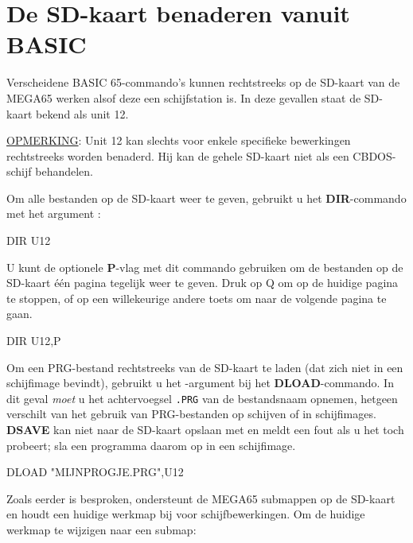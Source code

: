 \section{De SD-kaart benaderen vanuit BASIC}

Verscheidene BASIC 65-commando's kunnen rechtstreeks op de SD-kaart van de MEGA65 werken alsof deze een schijfstation is. In deze gevallen staat de SD-kaart bekend als unit 12.

\underline{OPMERKING}: Unit 12 kan slechts voor enkele specifieke bewerkingen rechtstreeks worden benaderd. Hij kan de gehele SD-kaart niet als een CBDOS-schijf behandelen.

Om alle bestanden op de SD-kaart weer te geven, gebruikt u het {\bf DIR}-commando met het argument :

\begin{screencode}
DIR U12
\end{screencode}

U kunt de optionele {\bf P}-vlag met dit commando gebruiken om de bestanden op de SD-kaart één pagina tegelijk weer te geven. Druk op Q om op de huidige pagina te stoppen, of op een willekeurige andere toets om naar de volgende pagina te gaan.

\begin{screencode}
DIR U12,P
\end{screencode}

Om een PRG-bestand rechtstreeks van de SD-kaart te laden (dat zich niet in een schijfimage bevindt), gebruikt u het -argument bij het {\bf DLOAD}-commando. In dit geval {\em moet} u het achtervoegsel {\tt .PRG} van de bestandsnaam opnemen, hetgeen verschilt van het gebruik van PRG-bestanden op schijven of in schijfimages. {\bf DSAVE} kan niet naar de SD-kaart opslaan met  en meldt een fout als u het toch probeert; sla een programma daarom op in een schijfimage.

\begin{screencode}
DLOAD "MIJNPROGJE.PRG",U12
\end{screencode}

Zoals eerder is besproken, ondersteunt de MEGA65 submappen op de SD-kaart en houdt een huidige werkmap bij voor schijfbewerkingen. Om de huidige werkmap te wijzigen naar een submap:


